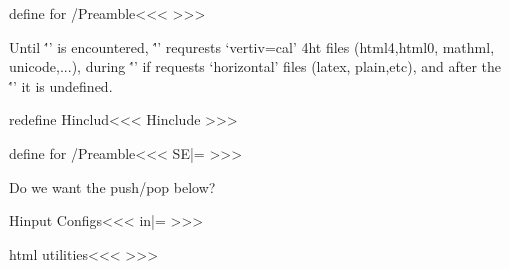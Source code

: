 \<define for /Preamble\><<<
\def\xtrct:hin#1,{\def\:temp{#1}\ifx \:temp\empty
   \def\xtrct:hin##1|<par del|>{\let\xtrct:hin|=\:UnDef}\else
      \def\:tempa##1.4ht##2|<par del|>{%
         \def\:temp{\Hinclude[*]{##1.4ht}}\def\:tempa{##2}}%
      \expandafter\:tempa\:temp .4ht|<par del|>%
      \ifx \:tempa\empty \else \:temp   \fi
   \fi  \xtrct:hin}
>>>


Until \''\Preamble' is encountered, \''\Hinclude' requrests
`vertiv=cal' 4ht files (html4,html0, mathml, unicode,...), during
\''\Preamble' if requests `horizontal' files (latex, plain,etc), and
after the \''\Preamble' it is undefined.



\<redefine Hinclud\><<<
\:Hinclude
>>>

\<define for /Preamble\><<<
\def\Use:N{0}
\let\:USE|=\empty
\def\:Use#1{\:USe #1,,\HAdvance\Use:N |by 1 }
\def\:USe#1,{\def\:temp{#1}\ifx\:temp\empty
     \edef\:temp{\noexpand\append:def\noexpand\:USE{\let\expandafter
      \noexpand\csname Use:\Use:N\endcsname\noexpand\:UnDef}}\:temp
   \else
     \edef\:temp{\noexpand\append:def\noexpand\:USE{\expandafter
      \noexpand\csname Use:\Use:N\endcsname}}\:temp
   \append:def\:USE{{#1}}%
   \expandafter\:USe\fi}
\def\:Hinclude{%
   \def\Hinclude{\afterassignment\:Use
      \expandafter\def\csname Use:\Use:N\endcsname ####1}%
   \def\:Hinclude{\ifx \:USE \empty 
       \let\Hinclude|=\:UnDef
       \let\:Hinclude|=\:UnDef
       \let\:Use|=\:UnDef
       \let\:USe|=\:UnDef
       \let\:USE|=\:UnDef
     \else
      \pend:def\:USE{\let\:USE|=\empty}%
      \expand:after{\:USE \:Hinclude}\fi}%
}
>>>




Do we want the push/pop below?


\<Hinput Configs\><<<
\let\:Hin|=\empty
\def\Hinput#1{\PushStack\:Hinputs\:Hin \def\:Hin{#1}%
   \expandafter\:Hinput\:Hincl{}{}\PopStack\:Hinputs\:Hin}
\def\:Hinput#1#2{\def\:temp{#2}\ifx \:temp\empty \else
     \let\:temp|=\empty   \def\:tempa{*}\def\:tempb{#1}%
     \ifx \:tempa\:tempb \def\:temp{}%
     \else \ifx \:Hin\:tempb  \def\:temp{}%
     \else \def\:tempb{#1.4ht}\ifx \:Hin\:tempb \def\:temp{}%
     \fi\fi\fi
   \expand:after{\:temp
     |<system NewConfigure|>\:Hinput}\fi}
>>>





\<html utilities\><<<
\def\exit:ifnot#1{%
   \edef\:temp{\def\noexpand\:temp####1,\:Hin,####2..//{%
      \noexpand\if !####2!\noexpand\else
      \noexpand\expandafter\noexpand\:gobble\noexpand\fi
      }\noexpand\:temp,#1,\:Hin,..//}\:temp\endinput }
>>>

